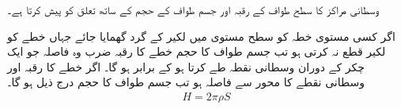 وسطانی مراکز کا سطح طواف کے رقبہ اور جسم طواف کے حجم کے ساتھ تعلق کو  پیش کرتا ہے۔

اگر کسی مستوی خطہ کو سطح مستوی میں لکیر کے گرد گھمایا جائے جہاں خطے کو لکیر قطع نہ کرتی ہو تب جسم طواف کا حجم خطے کا رقبہ ضرب وہ فاصلہ جو ایک چکر کے دوران وسطانی نقطہ طے کرتا ہو کے برابر ہو گا۔ اگر خطے کا رقبہ  اور وسطانی نقطے کا محور سے فاصلہ  ہو تب جسم طواف کا حجم درج ذیل ہو گا۔ 
\begin{align}
H=2\pi \rho S
\end{align}


